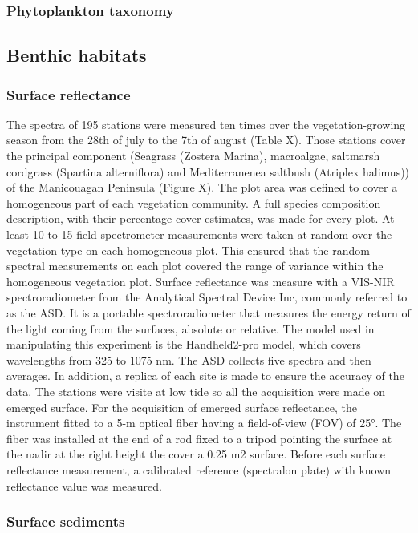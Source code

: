 \documentclass[essd, manuscript]{copernicus}
\begin{document}
\subsubsection{Phytoplankton taxonomy}

\subsection{Benthic habitats} \label{benthos}
\subsubsection{Surface reflectance}
The spectra of 195 stations were measured ten times over the vegetation-growing season from the 28th of july to the 7th of august (Table X). Those stations cover the principal component (Seagrass (Zostera Marina), macroalgae, saltmarsh cordgrass (Spartina alterniflora) and Mediterranenea saltbush (Atriplex halimus)) of the Manicouagan Peninsula (Figure X). The plot area was defined to cover a homogeneous part of each vegetation community. A full species composition description, with their percentage cover estimates, was made for every plot. At least 10 to 15 field spectrometer measurements were taken at random over the vegetation type on each homogeneous plot. This ensured that the random spectral measurements on each plot covered the range of variance within the homogeneous vegetation plot.
Surface reflectance was measure with a VIS-NIR spectroradiometer from the Analytical Spectral Device Inc, commonly referred to as the ASD. It is a portable spectroradiometer that measures the energy return of the light coming from the surfaces, absolute or relative. The model used in manipulating this experiment is the Handheld2-pro model, which covers wavelengths from 325 to 1075 nm. The ASD collects five spectra and then averages. In addition, a replica of each site is made to ensure the accuracy of the data. The stations were visite at low tide so all the acquisition were made on emerged surface. For the acquisition of emerged surface reflectance, the instrument fitted to a 5-m optical fiber having a field-of-view (FOV) of 25°. The fiber was installed at the end of a rod fixed to a tripod pointing the surface at the nadir at the right height the cover a 0.25 m2 surface. Before each surface reflectance measurement, a calibrated reference (spectralon plate) with known reflectance value was measured.

\subsubsection{Surface sediments}
\end{document}
